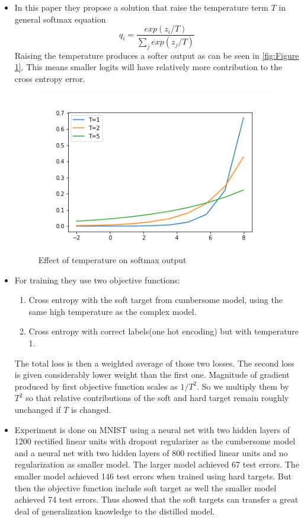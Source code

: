 \documentclass{article}
\begin{document}
\begin{itemize}
    \item In this paper they propose a solution that raise the temperature term $T$ in general softmax equation
    \begin{equation*}
        q_i = \dfrac{exp(z_i/T)}{\sum_{j}exp(z_j/T)}
    \end{equation*}
    Raising the temperature produces a softer output as can be seen in \autoref{fig:Figure 1}. This means smaller logits will have relatively more contribution to the cross entropy error.
    \begin{figure}
        \centering
        \includegraphics{softmax_temperature.png}
        \caption{Effect of temperature on softmax output}
        \label{fig:Figure 1}
    \end{figure}
    \item For training they use two objective functions:
    \begin{enumerate}
        \item Cross entropy with the soft target from cumbersome model, using the same high temperature as the complex model.
        \item Cross entropy with correct labels(one hot encoding) but with temperature 1. 
    \end{enumerate}
    The total loss is then a weighted average of those two losses. The second loss is given considerably lower weight than the first one. Magnitude of gradient produced by first objective function scales as $1/T^2$. So we multiply them by $T^2$ so that relative contributions of the soft and hard target remain roughly unchanged if $T$ is changed.
    \item Experiment is done on MNIST using a neural net with two hidden layers of 1200 rectified linear units with dropout regularizer as the cumbersome model and a neural net with two hidden layers of 800 rectified linear units and no regularization as smaller model. The larger model achieved 67 test errors. The smaller model achieved 146 test errors when trained using hard targets. But then the objective function include soft target as well the smaller model achieved 74 test errors. Thus showed that the soft targets can transfer a great deal of generalization knowledge to the distilled model.  

\end{itemize}
\end{document}
